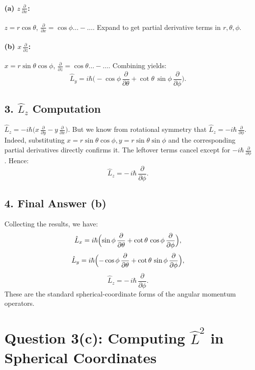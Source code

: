 \documentclass[12pt]{article}
\begin{document}
\paragraph{(a) $z\,\frac{\partial}{\partial x}$:}
\(z=r\cos\theta\), \(\frac{\partial}{\partial x}=\cos\phi\ldots-\ldots\). Expand to get partial derivative terms in $r,\theta,\phi$.\newline
\paragraph{(b) $x\,\frac{\partial}{\partial z}$:}
\(x=r\sin\theta\cos\phi\), \(\frac{\partial}{\partial z}=\cos\theta\ldots -\ldots\).\newline
Combining yields:
\[
\hat{L}_y
= i\hbar\bigl(-\cos\phi\,\frac{\partial}{\partial \theta} + \cot\theta\,\sin\phi\,\frac{\partial}{\partial \phi}\bigr).
\]

\subsection*{3. $\hat{L}_z$ Computation}
\(
\hat{L}_z = -i\hbar\bigl(x\,\frac{\partial}{\partial y} - y\,\frac{\partial}{\partial x}\bigr).
\)
But we know from rotational symmetry that $\hat{L}_z=-i\hbar\,\frac{\partial}{\partial \phi}$. Indeed, substituting $x=r\sin\theta\cos\phi, y=r\sin\theta\sin\phi$ and the corresponding partial derivatives directly confirms it. The leftover terms cancel except for $-i\hbar\,\frac{\partial}{\partial\phi}$. Hence:
\[
\boxed{\hat{L}_z = -\,i\hbar\,\frac{\partial}{\partial \phi}.}
\]

\subsection*{4. Final Answer (b)}
Collecting the results, we have:
\[
\hat{L}_x = i\hbar\Bigl(\sin\phi\,\frac{\partial}{\partial \theta} + \cot\theta\,\cos\phi\,\frac{\partial}{\partial \phi}\Bigr),
\]
\[
\hat{L}_y = i\hbar\Bigl(-\cos\phi\,\frac{\partial}{\partial \theta} + \cot\theta\,\sin\phi\,\frac{\partial}{\partial \phi}\Bigr),
\]
\[
\hat{L}_z = -\,i\hbar\,\frac{\partial}{\partial \phi}.
\]
These are the standard spherical-coordinate forms of the angular momentum operators.








\section*{Question 3(c): Computing $\hat{L}^2$ in Spherical Coordinates}
\end{document}
